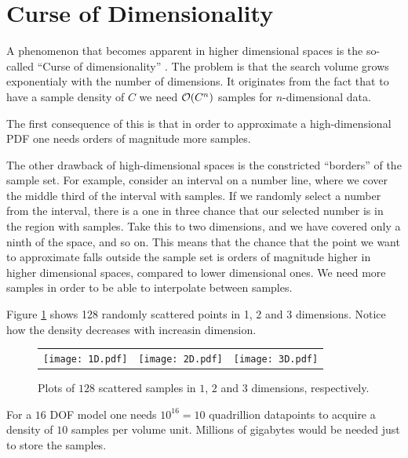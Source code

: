 \section{Curse of Dimensionality}
A phenomenon that becomes apparent in higher dimensional spaces is the so-called ``Curse of dimensionality'' \cite{EncyclopediaMachineLearning}. The problem is that the search volume grows exponentialy with the number of dimensions. It originates from the fact that to have a sample density of $C$ we need $\mathcal{O}{\left(C^n\right)}$ samples for $n$-dimensional data.

The first consequence of this is that in order to approximate a high-dimensional PDF one needs orders of magnitude more samples.

The other drawback of high-dimensional spaces is the constricted ``borders'' of the sample set. For example, consider an interval on a number line, where we cover the middle third of the interval with samples. If we randomly select a number from the interval, there is a one in three chance that our selected number is in the region with samples. Take this to two dimensions, and we have covered only a ninth of the space, and so on. This means that the chance that the point we want to approximate falls outside the sample set is orders of magnitude higher in higher dimensional spaces, compared to lower dimensional ones. We need more samples in order to be able to interpolate between samples.

\begin{example}
  Figure \ref{fig:curse-of-dimensionality} shows 128 randomly scattered points in 1, 2 and 3 dimensions. Notice how the density decreases with increasin dimension.
  \begin{figure}
    \begin{tabular}{rcl}
      \texttt{[image: 1D.pdf]}&
      \texttt{[image: 2D.pdf]}&
      \texttt{[image: 3D.pdf]}
    \end{tabular}
    \caption{Plots of $128$ scattered samples in $1$, $2$ and $3$ dimensions, respectively.}
    \label{fig:curse-of-dimensionality}
  \end{figure}
\end{example}

\begin{example}
  For a $16$ DOF model one needs $10^{16}=10$ quadrillion datapoints to acquire a density of $10$ samples per volume unit. Millions of gigabytes would be needed just to store the samples.
\end{example}


